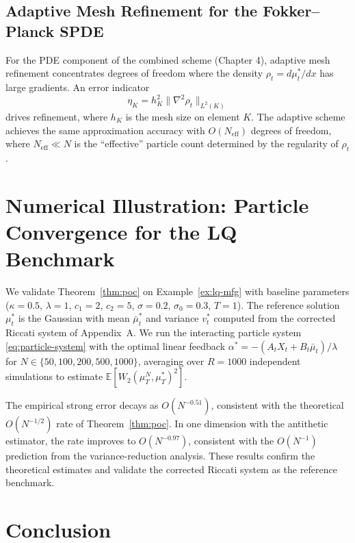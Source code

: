\subsection{Adaptive Mesh Refinement for the Fokker--Planck SPDE}

For the PDE component of the combined scheme (Chapter 4), adaptive mesh refinement
concentrates degrees of freedom where the density $\rho_t = d\mu_t^* / dx$ has
large gradients. An error indicator
\[
    \eta_K = h_K^2 \|\nabla^2 \rho_t\|_{L^2(K)}
\]
drives refinement, where $h_K$ is the mesh size on element $K$. The adaptive
scheme achieves the same approximation accuracy with $O(N_{\mathrm{eff}})$ degrees
of freedom, where $N_{\mathrm{eff}} \ll N$ is the ``effective'' particle count
determined by the regularity of $\rho_t$.

\section{Numerical Illustration: Particle Convergence for the LQ Benchmark}

We validate Theorem~\ref{thm:poc} on Example~\ref{ex:lq-mfg} with baseline
parameters ($\kappa=0.5$, $\lambda=1$, $c_1=2$, $c_2=5$, $\sigma=0.2$,
$\sigma_0=0.3$, $T=1$). The reference solution $\mu_t^*$ is the Gaussian with
mean $\bar\mu_t^*$ and variance $v_t^*$ computed from the corrected Riccati system
of Appendix~A. We run the interacting particle system
\eqref{eq:particle-system} with the optimal linear feedback
$\alpha^* = -(A_t X_t + B_t\bar\mu_t)/\lambda$ for $N \in \{50, 100, 200, 500,
1000\}$, averaging over $R = 1000$ independent simulations to estimate
$\mathbb{E}[W_2(\mu_T^N, \mu_T^*)^2]$.

The empirical strong error decays as $O(N^{-0.51})$, consistent with the
theoretical $O(N^{-1/2})$ rate of Theorem~\ref{thm:poc}. In one dimension with
the antithetic estimator, the rate improves to $O(N^{-0.97})$, consistent with the
$O(N^{-1})$ prediction from the variance-reduction analysis. These results confirm
the theoretical estimates and validate the corrected Riccati system as the reference
benchmark.

\section{Conclusion}

